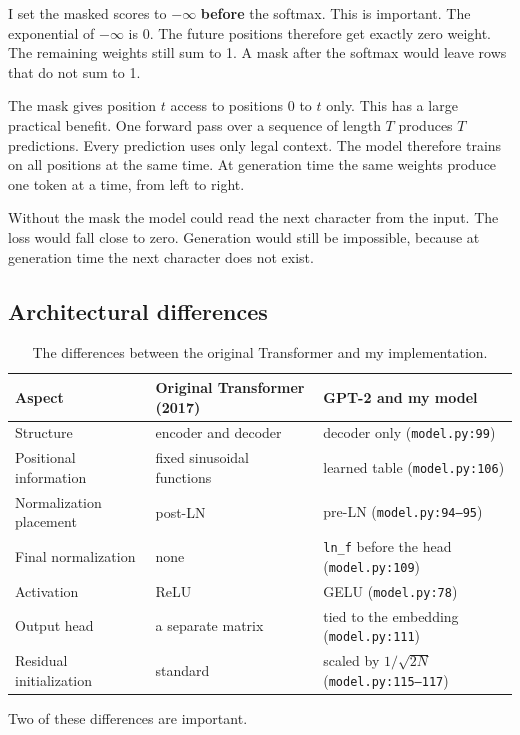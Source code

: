 \documentclass[11pt,a4paper]{article}
\newcommand{\code}[1]{\texttt{#1}}
\begin{document}
I set the masked scores to $-\infty$ \textbf{before} the softmax. This is important. The
exponential of $-\infty$ is 0. The future positions therefore get exactly zero weight. The
remaining weights still sum to 1. A mask after the softmax would leave rows that do not sum to 1.

The mask gives position $t$ access to positions 0 to $t$ only. This has a large practical benefit.
One forward pass over a sequence of length $T$ produces $T$ predictions. Every prediction uses
only legal context. The model therefore trains on all positions at the same time. At generation
time the same weights produce one token at a time, from left to right.

Without the mask the model could read the next character from the input. The loss would fall close
to zero. Generation would still be impossible, because at generation time the next character does
not exist.

\subsection{Architectural differences}
\label{sec:diffs}

\begin{table}[htbp]\centering\small
\begin{tabular}{@{}lll@{}}
\toprule
\textbf{Aspect} & \textbf{Original Transformer (2017)} & \textbf{GPT-2 and my model} \\
\midrule
Structure & encoder and decoder & decoder only (\code{model.py:99}) \\
Positional information & fixed sinusoidal functions & learned table (\code{model.py:106}) \\
Normalization placement & post-LN & pre-LN (\code{model.py:94--95}) \\
Final normalization & none & \code{ln\_f} before the head (\code{model.py:109}) \\
Activation & ReLU & GELU (\code{model.py:78}) \\
Output head & a separate matrix & tied to the embedding (\code{model.py:111}) \\
Residual initialization & standard & scaled by $1/\sqrt{2N}$ (\code{model.py:115--117}) \\
\bottomrule
\end{tabular}
\caption{The differences between the original Transformer and my implementation.}
\end{table}

Two of these differences are important.
\end{document}
